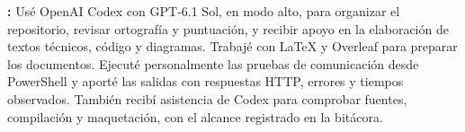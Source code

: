 \documentclass[10pt,a4paper]{article}
\begin{document}
\textbf{\personaCuatro:} Usé OpenAI Codex con GPT-6.1 Sol, en modo alto, para organizar el repositorio, revisar ortografía y puntuación, y recibir apoyo en la elaboración de textos técnicos, código y diagramas. Trabajé con LaTeX y Overleaf para preparar los documentos. Ejecuté personalmente las pruebas de comunicación desde PowerShell y aporté las salidas con respuestas HTTP, errores y tiempos observados. También recibí asistencia de Codex para comprobar fuentes, compilación y maquetación, con el alcance registrado en la bitácora.

\printbibliography[title={Referencias}]
\end{document}
